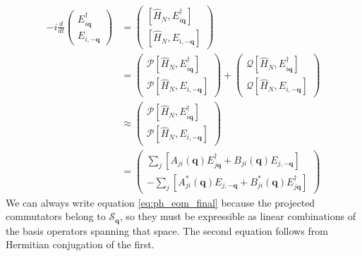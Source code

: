\begin{align}
-i\frac{d}{dt}\begin{pmatrix}
E_{i\mathbf q}^{\dagger}\\
E_{i,-\mathbf q}
\end{pmatrix}
&= \begin{pmatrix}
\left[\hat H_N,E_{i\mathbf q}^{\dagger}\right]\\
\left[\hat H_N,E_{i,-\mathbf q}\right]
\end{pmatrix}\\
&= \begin{pmatrix}
\mathcal{P}\left[\hat H_N,E_{i\mathbf q}^{\dagger}\right]\\
\mathcal{P}\left[\hat H_N,E_{i,-\mathbf q}\right]
\end{pmatrix}
+
\begin{pmatrix}
\mathcal{Q}\left[\hat H_N,E_{i\mathbf q}^{\dagger}\right]\\
\mathcal{Q}\left[\hat H_N,E_{i,-\mathbf q}\right]
\end{pmatrix}\\
&\approx \begin{pmatrix}
\mathcal{P}\left[\hat H_N,E_{i\mathbf q}^{\dagger}\right]\\
\mathcal{P}\left[\hat H_N,E_{i,-\mathbf q}\right]
\end{pmatrix}\\
&= \begin{pmatrix}
\sum_{j} \left[A_{ji}(\mathbf q) E_{j\mathbf q}^{\dagger} + B_{ji}(\mathbf q) E_{j,-\mathbf q}\right]\\
-\sum_{j} \left[A_{ji}^{*}(\mathbf q) E_{j,-\mathbf q} + B_{ji}^{*}(\mathbf q) E_{j\mathbf q}^{\dagger}\right]
\end{pmatrix} \label{eq:ph_eom_final}
\end{align}
We can always write equation \eqref{eq:ph_eom_final} because the projected commutators belong to
$\mathcal S_{\mathbf q}$, so they must be expressible as linear
combinations of the basis operators spanning that space. The second equation follows from Hermitian conjugation of the first.

